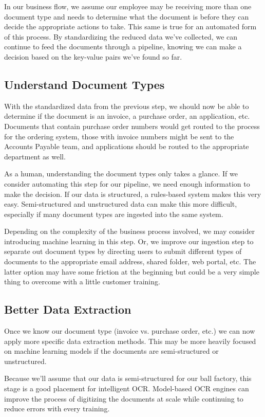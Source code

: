 \documentclass[conference]{IEEEtran}
\begin{document}
In our business flow, we assume our employee may be receiving more than one document type and needs to determine what the document is before they can decide the appropriate actions to take. This same is true for an automated form of this process. By standardizing the reduced data we've collected, we can continue to feed the documents through a pipeline, knowing we can make a decision based on the key-value pairs we've found so far.

\subsection{Understand Document Types}
With the standardized data from the previous step, we should now be able to determine if the document is an invoice, a purchase order, an application, etc. Documents that contain purchase order numbers would get routed to the process for the ordering system, those with invoice numbers might be sent to the Accounts Payable team, and applications should be routed to the appropriate department as well.

As a human, understanding the document types only takes a glance. If we consider automating this step for our pipeline, we need enough information to make the decision. If our data is structured, a rules-based system makes this very easy. Semi-structured and unstructured data can make this more difficult, especially if many document types are ingested into the same system. 

Depending on the complexity of the business process involved, we may consider introducing machine learning in this step. Or, we improve our ingestion step to separate out document types by directing users to submit different types of documents to the appropriate email address, shared folder, web portal, etc. The latter option may have some friction at the beginning but could be a very simple thing to overcome with a little customer training.

\subsection{Better Data Extraction}
Once we know our document type (invoice vs. purchase order, etc.) we can now apply more specific data extraction methods. This may be more heavily focused on machine learning models if the documents are semi-structured or unstructured.

Because we'll assume that our data is semi-structured for our ball factory, this stage is a good placement for intelligent OCR. Model-based OCR engines can improve the process of digitizing the documents at scale while continuing to reduce errors with every training.
\end{document}
